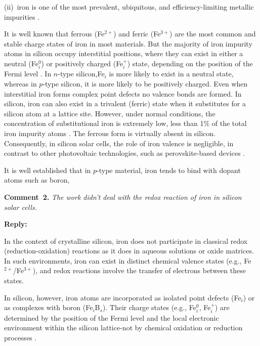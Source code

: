\documentclass[a4paper,fleqn]{cas-sc}
\begin{document}
\begin{mdframed}
(ii)~iron is one of the most prevalent, ubiquitous, and efficiency-limiting metallic impurities \cite{Buonassisi2006, IronSC}.

\begin{tcolorbox}
\textcolor[rgb]{1.00,0.07,0.00}{
It is well known that ferrous (Fe$^{2+}$) and ferric (Fe$^{3+}$) are the most common and stable charge states of iron in most materials.
But the majority of iron impurity atoms in silicon occupy interstitial positions,
where they can exist in either a neutral (Fe$_i^0$) or positively charged (Fe$_i^+$) state,
depending on the position of the Fermi level \cite{Macdonald2004,Istratov1999}.
In $n$-type silicon,Fe$_i$ is more likely to exist in a neutral state,
whereas in $p$-type silicon, it is more likely to be positively charged.
Even when interstitial iron forms complex point defects no valence bonds are formed.
In silicon, iron can also exist in a trivalent (ferric) state when it substitutes for a silicon atom at a lattice site.
However, under normal conditions, the concentration of substitutional iron is extremely low, less than 1\% of the total iron impurity atoms \cite{Wright2016}.
The ferrous form is virtually absent in silicon.
Consequently, in silicon solar cells, the role of iron valence is negligible,
in contrast to other photovoltaic technologies, such as perovskite-based devices \cite{Poindexter2017}.}%
\end{tcolorbox}

It is well established that in $p$-type material,
iron tends to bind with dopant atoms such as boron,
\end{mdframed}

\vspace{1cm}
\noindent
\textcolor[rgb]{0.00,0.50,1.00}{\textbf{Comment~2.}}
\emph{The work didn't deal with the redox reaction of iron in silicon solar cells.}

\noindent
\textcolor[rgb]{0.51,0.00,0.00}{\textbf{Reply:}}

In the context of crystalline silicon, iron does not participate in classical redox (reduction-oxidation) reactions as it does in aqueous solutions or oxide matrices.
In such environments, iron can exist in distinct chemical valence states (e.g., Fe$^{2+}$/Fe$^{3+}$), and redox reactions involve the transfer of electrons between these states.


In silicon, however, iron atoms are incorporated as isolated point defects (Fe$_i$) or as complexes with boron (Fe$_i$B$_s$).
Their charge states (e.g., Fe$_i^0$, Fe$_i^+$) are determined by the position of the Fermi level and the local electronic environment within the silicon lattice-not by chemical oxidation or reduction processes \cite{weber1983}.
\end{document}
